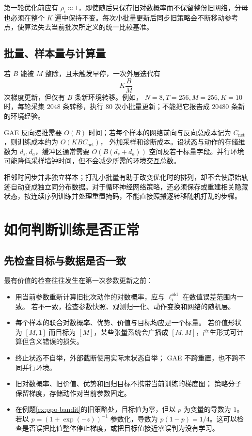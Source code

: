 \documentclass[UTF8,12pt,a4paper,fontset=fandol]{ctexart}
\begin{document}
第一轮优化前应有 $\rho_i\approx1$，即使随后只保存旧对数概率而不保留整份旧网络，分母也必须在整个 $K$ 遍中保持不变。每次小批量更新后同步旧策略会不断移动参考点，使算法失去当前批次所定义的统一比较基准。

\subsection{批量、样本量与计算量}

若 $B$ 能被 $M$ 整除，且未触发早停，一次外层迭代有
\[
  K\frac BM
\]
次梯度更新，但仅有 $B$ 条新环境转移。例如，
$N=8,T=256,M=256,K=10$ 时，每轮采集 $2048$ 条转移，执行 $80$ 次小批量更新；不能把它报告成 $20480$ 条新的环境经验。

GAE 反向递推需要 $O(B)$ 时间；若每个样本的网络前向与反向总成本记为
$C_{\mathrm{net}}$，则训练成本约为 $O(KBC_{\mathrm{net}})$，
外加采样和诊断成本。设状态与动作的存储维数为 $d_s,d_a$，缓冲区通常需要
$O(B(d_s+d_a))$ 空间及若干标量字段。并行环境可能降低采样墙钟时间，但不会减少所需的环境交互总数。

相邻时间步并非独立样本；打乱小批量有助于改变优化时的排列，却不会使原始轨迹自动变成独立同分布数据。对于循环神经网络策略，还必须保存或重建相关隐藏状态，按连续序列训练并处理重置掩码，不能直接照搬逐转移随机打乱的步骤。

\section{如何判断训练是否正常}
\label{sec:ppo-diagnostics}

\subsection{先检查目标与数据是否一致}

最有价值的检查往往发生在第一次参数更新之前：
\begin{itemize}
  \item 用当前参数重新计算旧批次动作的对数概率，应与
  $\ell_i^{\mathrm{old}}$ 在数值误差范围内一致。
  若不一致，检查参数快照、观测归一化、动作变换和网络的随机层。
  \item 每个样本的联合对数概率、优势、价值与目标均应是一个标量。
  若价值形状为 $[M,1]$ 而目标为 $[M]$，某些张量系统会广播成
  $[M,M]$，产生形式可计算但含义错误的损失。
  \item 终止状态不自举，外部截断使用实际末状态自举；
  GAE 不跨重置，也不跨不同并行环境。
  \item 旧对数概率、旧价值、优势和回归目标不携带当前训练的梯度图；
  策略分子保留梯度，存储动作对当前参数固定。
  \item 在例题\ref{ex:ppo-bandit}的旧策略处，目标值为零，但以
  $p$ 为变量的导数为 $1$。
  若以 $p=(1+\exp(-z))^{-1}$ 参数化，导数为
  $p(1-p)=1/4$。这可以检查是否误把比值整体停止梯度，或把目标值接近零误判为没有学习。
\end{itemize}
\end{document}
